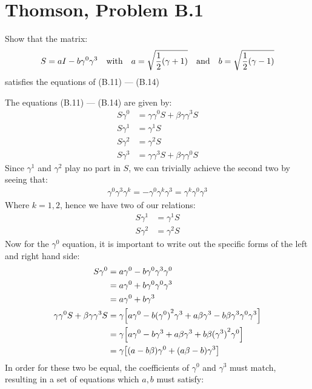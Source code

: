 \documentclass[12pt]{article}
\begin{document}
\section{Thomson, Problem B.1}
\begin{problem}
  Show that the matrix:
  \begin{align*}
    S=aI-b\gamma^0\gamma^3\quad\text{with}\quad a=\sqrt{\frac12\qty(\gamma+1)}\quad\text{and}\quad b=\sqrt{\frac12\qty(\gamma-1)}
  \end{align*}
  satisfies the equations of (B.11) --- (B.14)
\end{problem}
The equations (B.11) --- (B.14) are given by:
\begin{align*}
  S\gamma^0&=\gamma\gamma^0 S+\beta\gamma\gamma^3S\\
  S\gamma^1&=\gamma^1 S\\
  S\gamma^2&=\gamma^2 S\\
  S\gamma^3&=\gamma\gamma^3 S+\beta\gamma\gamma^0S
\end{align*}
Since $\gamma^1$ and $\gamma^2$ play no part in $S$, we can trivially achieve the second two by seeing that:
\begin{align*}
  \gamma^0\gamma^3\gamma^k=-\gamma^0\gamma^k\gamma^3=\gamma^k\gamma^0\gamma^3
\end{align*}
Where $k=1,2$, hence we have two of our relations:
\begin{equation}
  \label{eq:p9a}
  \boxed{
    \begin{aligned}
      S\gamma^1&=\gamma^1 S\\
      S\gamma^2&=\gamma^2 S
    \end{aligned}
  }
\end{equation}
Now for the $\gamma^0$ equation, it is important to write out the specific forms of the left and right hand side:
\begin{align*}
  S\gamma^0&=a\gamma^0-b\gamma^0\gamma^3\gamma^0\\
  &=a\gamma^0+b\gamma^0\gamma^0\gamma^3\\
  &=a\gamma^0+b\gamma^3\\
  \gamma\gamma^0 S+\beta\gamma\gamma^3S&=
  \gamma\qty[a\gamma^0-b{(\gamma^0)}^2\gamma^3
  +a\beta\gamma^3-b\beta\gamma^3\gamma^0\gamma^3]\\
  &=\gamma\qty[a\gamma^0-b\gamma^3
  +a\beta\gamma^3+b\beta{(\gamma^3)}^2\gamma^0]\\
  &=\gamma\qty[(a-b\beta)\gamma^0+(a\beta-b)\gamma^3]
\end{align*}
In order for these two be equal, the coefficients of $\gamma^0$ and $\gamma^3$ must match, resulting in a set of equations which $a,b$ must satisfy:
\end{document}

